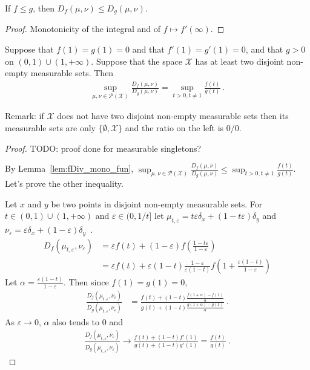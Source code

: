 \begin{lemma}
  \label{lem:fDiv_mono_fun}
  If $f \le g$, then $D_f(\mu, \nu) \le D_g(\mu, \nu)$.
\end{lemma}

\begin{proof}
Monotonicity of the integral and of $f \mapsto f'(\infty)$.
\end{proof}

\begin{theorem}
  \label{thm:fDiv_eq_sup_mul_fDiv}
  Suppose that $f(1) = g(1) = 0$ and that $f'(1) = g'(1) = 0$, and that $g>0$ on $(0,1) \cup (1, +\infty)$. Suppose that the space $\mathcal X$ has at least two disjoint non-empty measurable sets. Then
  \begin{align*}
  \sup_{\mu, \nu \in \mathcal P(\mathcal X)} \frac{D_f(\mu, \nu)}{D_g(\mu, \nu)}
  = \sup_{t > 0, t \ne 1} \frac{f(t)}{g(t)}
  \: .
  \end{align*}
\end{theorem}

Remark: if $\mathcal X$ does not have two disjoint non-empty measurable sets then its measurable sets are only $\{\emptyset, \mathcal X\}$ and the ratio on the left is $0/0$.

\begin{proof}%
{}
TODO: proof done for measurable singletons?

By Lemma~\ref{lem:fDiv_mono_fun}, $\sup_{\mu, \nu \in \mathcal P(\mathcal X)} \frac{D_f(\mu, \nu)}{D_g(\mu, \nu)} \le \sup_{t > 0, t \ne 1} \frac{f(t)}{g(t)}$. Let's prove the other inequality.

Let $x$ and $y$ be two points in disjoint non-empty measurable sets. For $t \in (0,1) \cup (1, +\infty)$ and $\varepsilon \in (0, 1/t]$ let $\mu_{t, \varepsilon} = t \varepsilon \delta_x + (1 - t \varepsilon) \delta_y$ and $\nu_\varepsilon = \varepsilon \delta_x + (1 - \varepsilon) \delta_y$~.
\begin{align*}
D_f(\mu_{t, \varepsilon}, \nu_\varepsilon)
&= \varepsilon f(t) + (1 - \varepsilon) f(\frac{1 - t \varepsilon}{1 - \varepsilon})
\\
&= \varepsilon f(t) + \varepsilon (1 - t) \frac{1 - \varepsilon}{\varepsilon (1 - t)} f(1 + \frac{\varepsilon(1 - t)}{1 - \varepsilon})
\end{align*}
Let $\alpha = \frac{\varepsilon (1 - t)}{1 - \varepsilon}$. Then since $f(1) = g(1) = 0$,
\begin{align*}
\frac{D_f(\mu_{t, \varepsilon}, \nu_\varepsilon)}{D_g(\mu_{t, \varepsilon}, \nu_\varepsilon)}
&= \frac{f(t) + (1 - t)\frac{f(1 + \alpha) - f(1)}{\alpha}}{g(t) + (1 - t)\frac{g(1 + \alpha) - g(1)}{\alpha}} \: .
\end{align*}
As $\varepsilon \to 0$, $\alpha$ also tends to 0 and
\begin{align*}
\frac{D_f(\mu_{t, \varepsilon}, \nu_\varepsilon)}{D_g(\mu_{t, \varepsilon}, \nu_\varepsilon)}
\to \frac{f(t) + (1 - t)f'(1)}{g(t) + (1 - t)g'(1)}
= \frac{f(t)}{g(t)}
\: .
\end{align*}
\end{proof}



